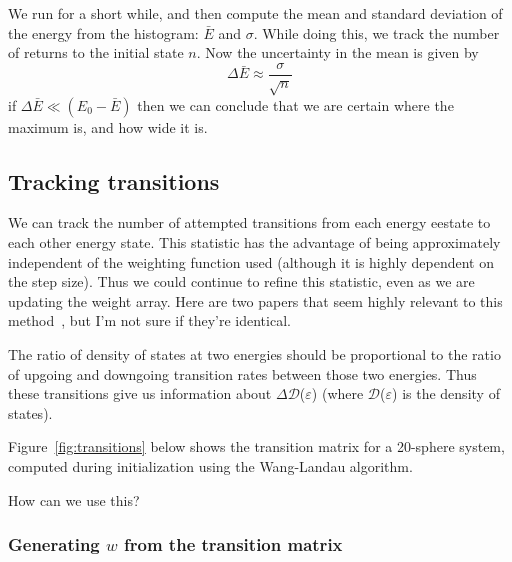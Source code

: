 \documentclass[letterpaper,twocolumn,amsmath,amssymb,pre,aps,10pt]{revtex4-1}
\begin{document}
We run for a short while, and then compute the mean and standard
deviation of the energy from the histogram: $\bar E$ and $\sigma$.
While doing this, we track the number of returns to the initial state
$n$.  Now the uncertainty in the mean is given by
\begin{equation}
  \Delta \bar E \approx \frac{\sigma}{\sqrt{n}}
\end{equation}
if $\Delta \bar E \ll (E_0 - \bar E)$ then we can conclude that we are
certain where the maximum is, and how wide it is.


\subsection{Tracking transitions}

We can track the number of attempted transitions from each energy
eestate to each other energy state.  This statistic has the advantage of
being approximately independent of the weighting function used
(although it is highly dependent on the step size).  Thus we could
continue to refine this statistic, even as we are updating the weight
array.  Here are two papers that seem highly relevant to this
method~\cite{wang1999transition, wang2002transition}, but I'm not sure
if they're identical.

The ratio of density of states at two energies should be proportional
to the ratio of upgoing and downgoing transition rates between those
two energies.  Thus these transitions give us information about
$\Delta$$\mathcal{D}$($\varepsilon$) (where $\mathcal{D}$($\varepsilon$) 
is the density of states).

Figure~\ref{fig:transitions} below shows the transition matrix for a
20-sphere system, computed during initialization using the Wang-Landau
algorithm.

How can we use this?

\subsubsection{Generating $w$ from the transition matrix}
\end{document}
